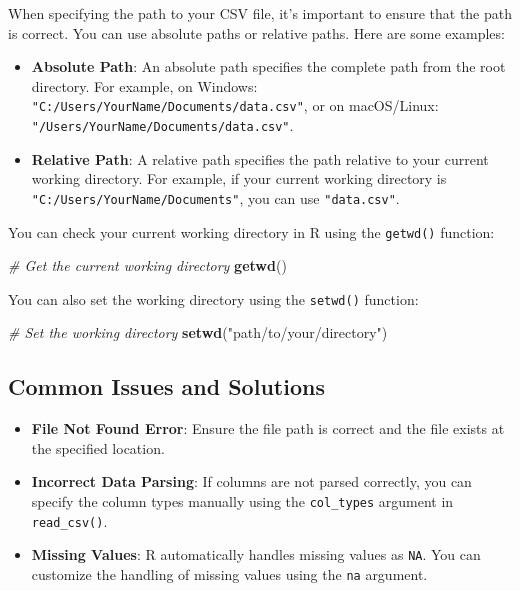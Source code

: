 \documentclass[
]{book}
\newenvironment{Shaded}{\begin{snugshade}}{\end{snugshade}}
\newcommand{\CommentTok}[1]{\textcolor[rgb]{0.56,0.35,0.01}{\textit{#1}}}
\newcommand{\FunctionTok}[1]{\textcolor[rgb]{0.13,0.29,0.53}{\textbf{#1}}}
\newcommand{\NormalTok}[1]{#1}
\newcommand{\StringTok}[1]{\textcolor[rgb]{0.31,0.60,0.02}{#1}}
\providecommand{\tightlist}{%
  \setlength{\itemsep}{0pt}\setlength{\parskip}{0pt}}
\begin{document}
When specifying the path to your CSV file, it's important to ensure that the path is correct. You can use absolute paths or relative paths. Here are some examples:

\begin{itemize}
\tightlist
\item
  \textbf{Absolute Path}: An absolute path specifies the complete path from the root directory. For example, on Windows: \texttt{"C:/Users/YourName/Documents/data.csv"}, or on macOS/Linux: \texttt{"/Users/YourName/Documents/data.csv"}.
\item
  \textbf{Relative Path}: A relative path specifies the path relative to your current working directory. For example, if your current working directory is \texttt{"C:/Users/YourName/Documents"}, you can use \texttt{"data.csv"}.
\end{itemize}

You can check your current working directory in R using the \texttt{getwd()} function:

\begin{Shaded}
\begin{Highlighting}[]
\CommentTok{\# Get the current working directory}
\FunctionTok{getwd}\NormalTok{()}
\end{Highlighting}
\end{Shaded}

You can also set the working directory using the \texttt{setwd()} function:

\begin{Shaded}
\begin{Highlighting}[]
\CommentTok{\# Set the working directory}
\FunctionTok{setwd}\NormalTok{(}\StringTok{"path/to/your/directory"}\NormalTok{)}
\end{Highlighting}
\end{Shaded}

\hypertarget{common-issues-and-solutions}{%
\subsection{Common Issues and Solutions}\label{common-issues-and-solutions}}

\begin{itemize}
\tightlist
\item
  \textbf{File Not Found Error}: Ensure the file path is correct and the file exists at the specified location.
\item
  \textbf{Incorrect Data Parsing}: If columns are not parsed correctly, you can specify the column types manually using the \texttt{col\_types} argument in \texttt{read\_csv()}.
\item
  \textbf{Missing Values}: R automatically handles missing values as \texttt{NA}. You can customize the handling of missing values using the \texttt{na} argument.
\end{itemize}
\end{document}
